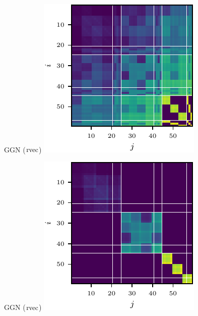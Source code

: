 \begin{figure}[t!]
\begin{minipage}[t]{0.485\linewidth}
  \end{minipage}
  \\
  \begin{minipage}[t]{0.485\linewidth}
    \centering
     GGN ($\operatorname{rvec}$)\vspace{1ex}
    \includegraphics[width=0.8\linewidth]{../kfs/plots/synthetic_rvec_ggn_full.pdf}
  \end{minipage}
  \hfill
  \begin{minipage}[t]{0.485\linewidth}
    \centering
    GGN ($\operatorname{rvec}$)\vspace{1ex}
    \includegraphics[width=0.8\linewidth]{../kfs/plots/synthetic_rvec_ggn_kfac.pdf}

\end{minipage}
\end{figure}
